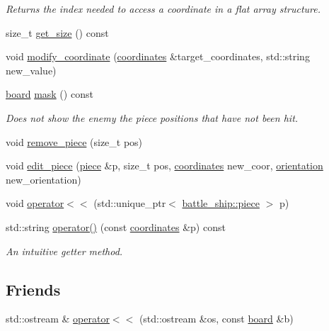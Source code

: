 \begin{DoxyCompactItemize}
\begin{DoxyCompactList}\small\item\em Returns the index needed to access a coordinate in a flat array structure. \end{DoxyCompactList}\item 
size\+\_\+t \hyperlink{classbattle__ship_1_1board_a483229b229338d1b5d1d19831c92d788}{get\+\_\+size} () const
\item 
void \hyperlink{classbattle__ship_1_1board_a1c79f537306e8f2f84c8aa41a90430e6}{modify\+\_\+coordinate} (\hyperlink{structbattle__ship_1_1coordinates}{coordinates} \&target\+\_\+coordinates, std\+::string new\+\_\+value)
\item 
\hyperlink{classbattle__ship_1_1board}{board} \hyperlink{classbattle__ship_1_1board_a0dd14fd999e0359ad0a3ecee47fe639d}{mask} () const
\begin{DoxyCompactList}\small\item\em Does not show the enemy the piece positions that have not been hit. \end{DoxyCompactList}\item 
void \hyperlink{classbattle__ship_1_1board_a19d236125f444778e5789109d9c1093b}{remove\+\_\+piece} (size\+\_\+t pos)
\item 
void \hyperlink{classbattle__ship_1_1board_ab6dad94144c5142f3b956a78c6810a24}{edit\+\_\+piece} (\hyperlink{classbattle__ship_1_1piece}{piece} \&p, size\+\_\+t pos, \hyperlink{structbattle__ship_1_1coordinates}{coordinates} new\+\_\+coor, \hyperlink{namespacebattle__ship_aed87488f0a73f0d0679fe343fb61c784}{orientation} new\+\_\+orientation)
\item 
void \hyperlink{classbattle__ship_1_1board_a9afa4baeef0df47e4a2efe05de9cb8eb}{operator$<$$<$} (std\+::unique\+\_\+ptr$<$ \hyperlink{classbattle__ship_1_1piece}{battle\+\_\+ship\+::piece} $>$ p)
\item 
std\+::string \hyperlink{classbattle__ship_1_1board_a6977bbdbc6ed5855ea538dcec5a22699}{operator()} (const \hyperlink{structbattle__ship_1_1coordinates}{coordinates} \&p) const
\begin{DoxyCompactList}\small\item\em An intuitive getter method. \end{DoxyCompactList}\end{DoxyCompactItemize}
\subsection*{Friends}
\begin{DoxyCompactItemize}
\item 
std\+::ostream \& \hyperlink{classbattle__ship_1_1board_a1a31fc970cf43cac6d5b1a44e3831f5d}{operator$<$$<$} (std\+::ostream \&os, const \hyperlink{classbattle__ship_1_1board}{board} \&b)
\end{DoxyCompactItemize}


